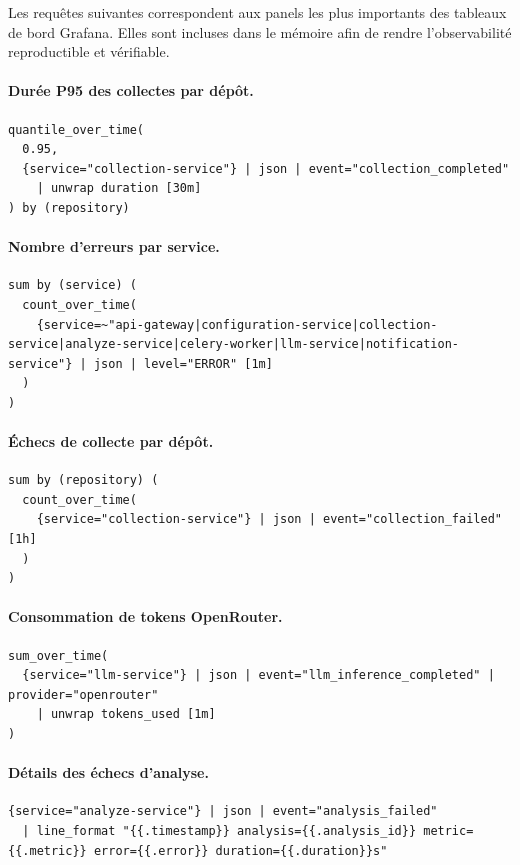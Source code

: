 Les requêtes suivantes correspondent aux panels les plus importants des tableaux de bord Grafana.
Elles sont incluses dans le mémoire afin de rendre l'observabilité reproductible et vérifiable.

\paragraph{Durée P95 des collectes par dépôt.}
\begin{verbatim}
quantile_over_time(
  0.95,
  {service="collection-service"} | json | event="collection_completed"
    | unwrap duration [30m]
) by (repository)
\end{verbatim}

\paragraph{Nombre d'erreurs par service.}
\begin{verbatim}
sum by (service) (
  count_over_time(
    {service=~"api-gateway|configuration-service|collection-service|analyze-service|celery-worker|llm-service|notification-service"} | json | level="ERROR" [1m]
  )
)
\end{verbatim}

\paragraph{Échecs de collecte par dépôt.}
\begin{verbatim}
sum by (repository) (
  count_over_time(
    {service="collection-service"} | json | event="collection_failed" [1h]
  )
)
\end{verbatim}

\paragraph{Consommation de tokens OpenRouter.}
\begin{verbatim}
sum_over_time(
  {service="llm-service"} | json | event="llm_inference_completed" | provider="openrouter"
    | unwrap tokens_used [1m]
)
\end{verbatim}

\paragraph{Détails des échecs d'analyse.}
\begin{verbatim}
{service="analyze-service"} | json | event="analysis_failed"
  | line_format "{{.timestamp}} analysis={{.analysis_id}} metric={{.metric}} error={{.error}} duration={{.duration}}s"
\end{verbatim}

